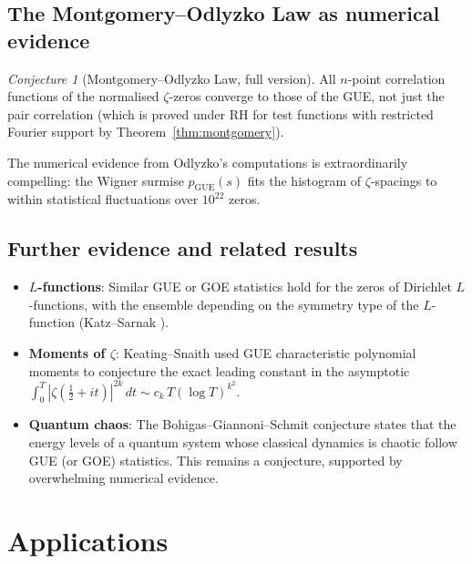 \documentclass[12pt,a4paper]{amsart}
\theoremstyle{definition}
\theoremstyle{remark}
\newtheorem{conjecture}[theorem]{Conjecture}
\begin{document}
\subsection{The Montgomery--Odlyzko Law as numerical evidence}

\begin{conjecture}[Montgomery--Odlyzko Law, full version]
\label{conj:moo}
All $n$-point correlation functions of the normalised $\zeta$-zeros converge
to those of the GUE, not just the pair correlation (which is proved
under RH for test functions with restricted Fourier support by
Theorem~\ref{thm:montgomery}).
\end{conjecture}

The numerical evidence from Odlyzko's computations \cite{Odlyzko1987, Odlyzko2001}
is extraordinarily compelling: the Wigner surmise $p_{\mathrm{GUE}}(s)$ fits
the histogram of $\zeta$-spacings to within statistical fluctuations
over $10^{22}$ zeros.

\subsection{Further evidence and related results}

\begin{itemize}
  \item \textbf{$L$-functions}: Similar GUE or GOE statistics hold for the
    zeros of Dirichlet $L$-functions, with the ensemble depending on the
    symmetry type of the $L$-function (Katz--Sarnak \cite{KatzSarnak1999}).
  \item \textbf{Moments of $\zeta$}: Keating--Snaith \cite{KeatingSnaith2000}
    used GUE characteristic polynomial moments to conjecture the exact leading
    constant in the asymptotic $\int_0^T |\zeta(\frac{1}{2}+it)|^{2k}\,dt \sim c_k\,T(\log T)^{k^2}$.
  \item \textbf{Quantum chaos}: The Bohigas--Giannoni--Schmit conjecture
    states that the energy levels of a quantum system whose classical dynamics
    is chaotic follow GUE (or GOE) statistics. This remains a conjecture,
    supported by overwhelming numerical evidence.
\end{itemize}

\section{Applications}
\label{sec:applications}
\end{document}
